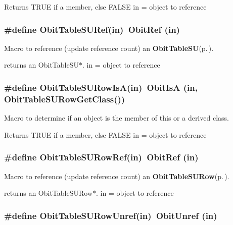 Returns TRUE if a member, else FALSE in = object to reference 
\subsubsection{\setlength{\rightskip}{0pt plus 5cm}\#define Obit\-Table\-SURef(in)\ Obit\-Ref (in)}\label{ObitTableSU_8h_a2}


Macro to reference (update reference count) an {\bf Obit\-Table\-SU}{\rm (p.\,\pageref{structObitTableSU})}. 

returns an Obit\-Table\-SU$\ast$. in = object to reference 
\subsubsection{\setlength{\rightskip}{0pt plus 5cm}\#define Obit\-Table\-SURow\-Is\-A(in)\ Obit\-Is\-A (in, Obit\-Table\-SURow\-Get\-Class())}\label{ObitTableSU_8h_a6}


Macro to determine if an object is the member of this or a derived class. 

Returns TRUE if a member, else FALSE in = object to reference 
\subsubsection{\setlength{\rightskip}{0pt plus 5cm}\#define Obit\-Table\-SURow\-Ref(in)\ Obit\-Ref (in)}\label{ObitTableSU_8h_a5}


Macro to reference (update reference count) an {\bf Obit\-Table\-SURow}{\rm (p.\,\pageref{structObitTableSURow})}. 

returns an Obit\-Table\-SURow$\ast$. in = object to reference 
\subsubsection{\setlength{\rightskip}{0pt plus 5cm}\#define Obit\-Table\-SURow\-Unref(in)\ Obit\-Unref (in)}\label{ObitTableSU_8h_a4}


